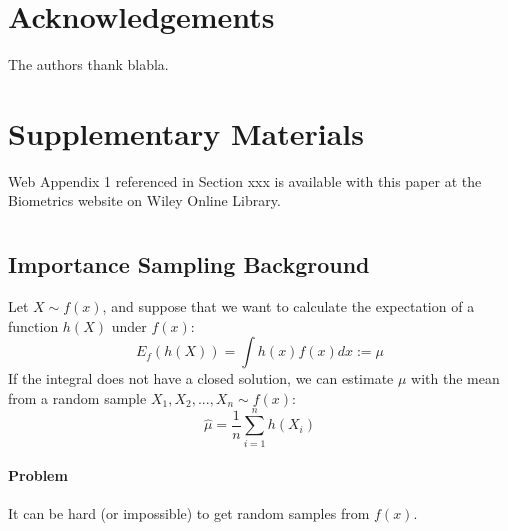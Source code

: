 \documentclass[useAMS,usenatbib]{biom}
\begin{document}
\backmatter


\section*{Acknowledgements}

The authors thank blabla.\vspace*{-8pt}


\section*{Supplementary Materials}

Web Appendix 1 referenced in Section xxx is available
with this paper at the Biometrics website on Wiley Online Library.
\vspace*{-8pt}


 

\appendix

\section{}
\subsection{Importance Sampling Background}
\label{background}

Let $X \sim f(x)$, and suppose that we want to calculate the
expectation of a function $h(X)$ under $f(x)$:
\begin{equation}
E_f(h(X)) = \int h(x) f(x) dx := \mu
\end{equation}
If the integral does not have a closed solution, we can estimate $\mu$
with the mean from a random sample $X_1,X_2,...,X_n \sim f(x)$:
\begin{equation}
\hat{\mu} = \frac{1}{n} \sum_{i=1}^n h(X_i)
\end{equation}

\paragraph{Problem} It can be hard (or impossible) to get random samples
from $f(x)$.
\end{document}
